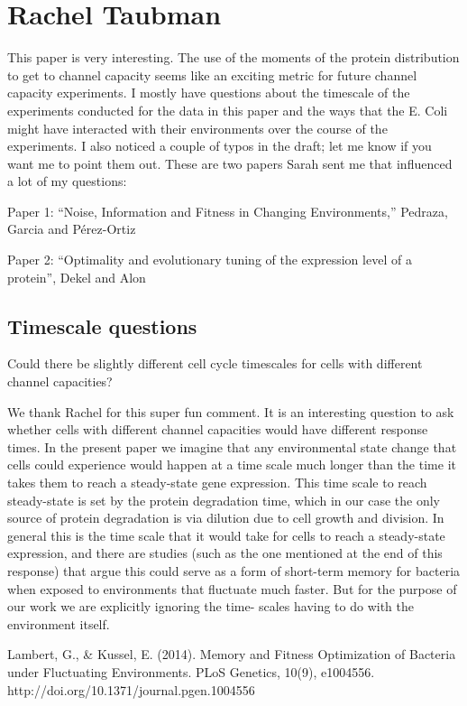 \section{Rachel Taubman}

This paper is very interesting. The use of the moments of the protein
distribution to get to channel capacity seems like an exciting metric for future
channel capacity experiments. I mostly have questions about the timescale of the
experiments conducted for the data in this paper and the ways that the E. Coli
might have interacted with their environments over the course of the
experiments. I also noticed a couple of typos in the draft; let me know if you
want me to point them out. These are two papers Sarah sent me that influenced a
lot of my questions:

Paper 1: “Noise, Information and Fitness in Changing Environments,” Pedraza,
Garcia and Pérez-Ortiz

Paper 2: “Optimality and evolutionary tuning of the expression level of a
protein”, Dekel and Alon

\subsection{Timescale questions}
\begin{tcolorbox}
Could there be slightly different cell cycle timescales for cells with different
channel capacities?
\end{tcolorbox}
We thank Rachel for this super fun comment. It is an interesting question to
ask whether cells with different channel capacities would have different
response times. In the present paper we imagine that any environmental state
change that cells could experience would happen at a time scale much longer than
the time it takes them to reach a steady-state gene expression. This time scale
to reach steady-state is set by the protein degradation time, which in our case
the only source of protein degradation is via dilution due to cell growth and
division. In general this is the time scale that it would take for cells to
reach a steady-state expression, and there are studies (such as the one
mentioned at the end of this response) that argue this could serve as a form of
short-term memory for bacteria when exposed to environments that fluctuate much
faster. But for the purpose of our work we are explicitly ignoring the time-
scales having to do with the environment itself.

Lambert, G., & Kussel, E. (2014). Memory and Fitness Optimization of Bacteria
under Fluctuating Environments. PLoS Genetics, 10(9), e1004556.
http://doi.org/10.1371/journal.pgen.1004556

